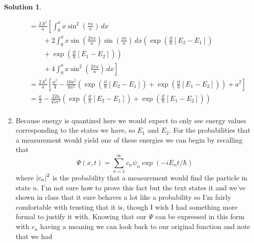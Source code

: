 \documentclass[10pt]{article}
\theoremstyle{definition}
\newtheorem{soln}{Solution}
\begin{document}
\begin{soln}
\begin{enumerate}[label=(\alph*)]
\begin{align*}
             & =\frac{2A^2}{a}\left[\int_{0}^{a}x\sin^2\left(\frac{\pi x}{a}\right)\,dx\right.                                                                                   \\
             & \qquad+2\int_{0}^{a}x\sin\left(\frac{2\pi x}{a}\right)\sin\left(\frac{\pi x}{a}\right)\,dx\left(\exp(\frac{it}{\hbar}\left[E_2-E_1\right])\right.                 \\
             & \qquad+\left.\exp(\frac{it}{\hbar}\left[E_1-E_2\right])\right)                                                                                                    \\
             & \qquad+\left.4\int_{0}^{a}x\sin^2\left(\frac{2\pi x}{a}\right)\,dx\right]                                                                                         \\
             & =\frac{2A^2}{a}\left[\frac{a^2}{4}
              -\frac{16a^2}{9\pi^2}\left(\exp(\frac{it}{\hbar}\left[E_2-E_1\right])
              +\exp(\frac{it}{\hbar}\left[E_1-E_2\right])\right)
            +a^2\right]                                                                                                                                                          \\
             & =\frac{a}{2}-\frac{32a}{45\pi^2}\left(\exp(\frac{it}{\hbar}\left[E_2-E_1\right])
            +\exp(\frac{it}{\hbar}\left[E_1-E_2\right])\right)                                                                                                                   \\
          \end{align*}
    \item Because energy is quantized here we would expect to only see energy values corresponding to the states we have, so $E_1$ and $E_2$.
          For the probabilities that a measurement would yield one of these energies we can begin by
          recalling that
          $$\Psi(x,t)=\sum_{n=1}^{\infty}c_n\psi_n\exp(-iE_nt/\hbar)$$
          where $\abs{c_n}^2$ is the probability that a measurement would find the particle in state
          $n$. I'm not sure how to prove this fact but the text states it and we've shown in class
          that it sure behaves a lot like a probability so I'm fairly comfortable with trusting that it is,
          though I wish I had something more formal to justify it with.
          Knowing that our $\Psi$ can be expressed in this form with $c_n$ having a meaning
          we can look back to our original function and note that we had

\end{enumerate}
\end{soln}
\end{document}
